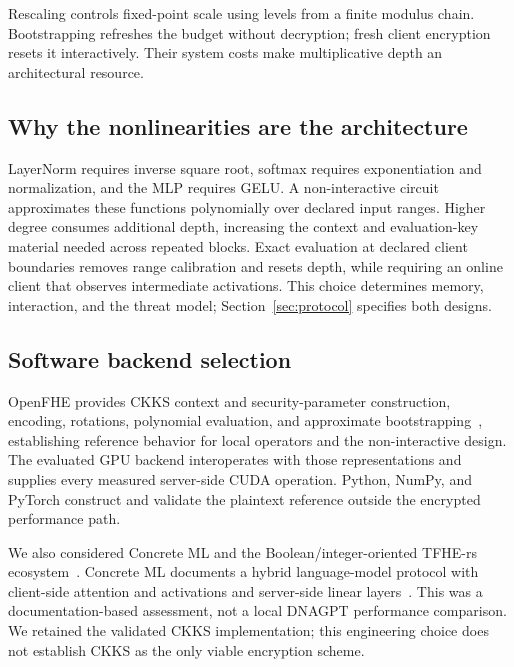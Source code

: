 Rescaling controls fixed-point scale using levels from a finite modulus chain. Bootstrapping
refreshes the budget without decryption; fresh client encryption resets it interactively. Their
system costs make multiplicative depth an architectural resource.

\subsection{Why the nonlinearities are the architecture}
LayerNorm requires inverse square root, softmax requires exponentiation and normalization, and the
MLP requires GELU. A non-interactive circuit approximates these functions polynomially over declared
input ranges. Higher degree consumes additional depth, increasing the context and evaluation-key
material needed across repeated blocks. Exact evaluation at declared client boundaries removes
range calibration and resets depth, while requiring an online client that observes intermediate
activations. This choice determines memory, interaction, and the threat model;
Section~\ref{sec:protocol} specifies both designs.

\subsection{Software backend selection}
OpenFHE provides CKKS context and security-parameter construction, encoding, rotations, polynomial
evaluation, and approximate bootstrapping~\cite{openfhe}, establishing reference behavior for local
operators and the non-interactive design. The evaluated GPU backend interoperates with those
representations and supplies every measured server-side CUDA operation. Python, NumPy, and PyTorch
construct and validate the plaintext reference outside the encrypted performance path.

We also considered Concrete ML and the Boolean/integer-oriented TFHE-rs
ecosystem~\cite{concreteml,tfhers}. Concrete ML documents a hybrid language-model protocol with
client-side attention and activations and server-side linear layers~\cite{concreteml-inference}.
This was a documentation-based assessment, not a local DNAGPT performance comparison. We retained
the validated CKKS implementation; this engineering choice does not establish CKKS as the only
viable encryption scheme.
